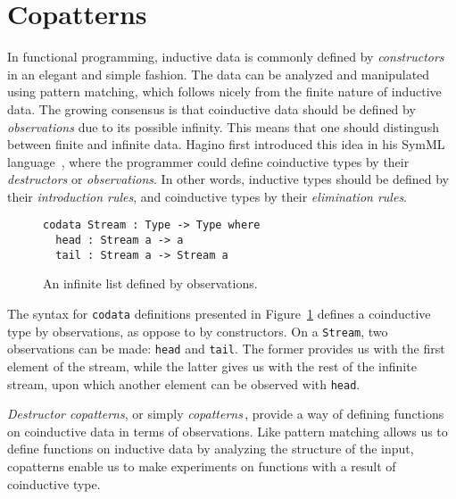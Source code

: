 

\section{Copatterns}
\label{sec:copatterns}
In functional programming, inductive data is commonly defined by \emph{constructors} in an
elegant and simple fashion. The data can be analyzed and manipulated using
pattern matching, which follows nicely from the finite nature of inductive
data. The growing consensus is that coinductive data should be defined by
\emph{observations} due to its possible infinity. This means that one should distingush
between finite and infinite data. Hagino first introduced this idea in his SymML
language \,\citep{Hagino89}, where the programmer could define coinductive types
by their \emph{destructors} or \emph{observations}. In other words, inductive
types should be defined by their \emph{introduction rules}, and coinductive types by
their \emph{elimination rules}.

\begin{figure}[h]
\begin{lstlisting}[mathescape]
codata Stream : Type -> Type where
  head : Stream a -> a
  tail : Stream a -> Stream a 
\end{lstlisting}
\caption{An infinite list defined by observations.}
\label{fig:stream}
\end{figure}

The syntax for \texttt{codata} definitions presented in
Figure~\ref{fig:stream} defines a coinductive type by observations, as oppose to
by constructors. On a \texttt{Stream}, two observations can be made:
\texttt{head} and \texttt{tail}. The former provides us with the first element
of the stream, while the latter gives us with the rest of the infinite stream,
upon which another element can be observed with \texttt{head}. 

\emph{Destructor copatterns}, or simply
\emph{copatterns}\,\citep{Abel13Copatterns}, provide a way of defining functions
on coinductive data in terms of observations. Like pattern matching allows us to
define functions on inductive data by analyzing the structure of the input,
copatterns enable us to make experiments on functions with a result of
coinductive type.

